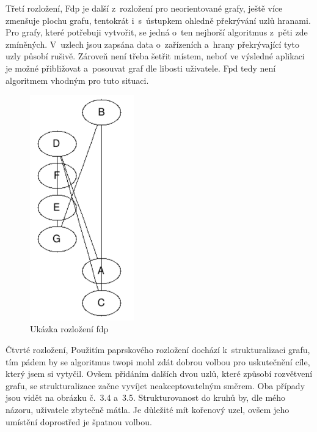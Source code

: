 \documentclass[color,table,oneside,nolot,nolof]{fithesis}
\begin{document}
	Třetí rozložení, \cite{graphviz_layout} 
	Fdp je další z~rozložení pro neorientované grafy, ještě více zmenšuje plochu grafu, tentokrát i~s~ústupkem ohledně překrývání
	uzlů hranami. Pro grafy, které potřebuji vytvořit, se jedná o~ten nejhorší algoritmus z~pěti zde zmíněných. V~uzlech jsou zapsána data o~zařízeních a~hrany překrývající tyto uzly
	působí rušivě. Zároveň není třeba šetřit místem, neboť ve výsledné aplikaci je možné přibližovat a~posouvat graf dle libosti uživatele. Fpd tedy není algoritmem vhodným pro tuto
	situaci.

\begin{figure}
	\label{fig:Ukázka rozložení fdp}
	\caption{Ukázka rozložení fdp}
	\centering
	\includegraphics[width=0.4\textwidth]{pictures/fdp_example.png} 
\end{figure}

	Čtvrté rozložení, \cite{graphviz_layout}
	Použitím paprskového rozložení dochází k~strukturalizaci grafu, tím pádem by se algoritmus twopi mohl zdát 
	dobrou volbou pro uskutečnění cíle, který jsem si vytyčil. Ovšem přidáním dalších dvou uzlů, které způsobí rozvětvení grafu, se strukturalizace začne vyvíjet neakceptovatelným směrem.
	Oba případy jsou vidět na obrázku č.~3.4 a~3.5. Strukturovanost do kruhů by, dle mého názoru, uživatele zbytečně mátla. Je důležité mít kořenový uzel, ovšem jeho umístění doprostřed je špatnou
	volbou.
\end{document}
